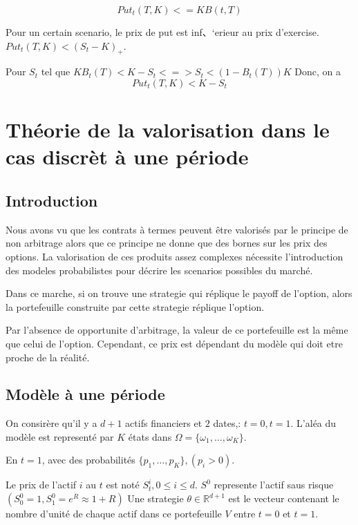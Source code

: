 \documentclass{article}
\begin{document}
\begin{equation}
Put_t(T, K) <= KB(t, T)
\end{equation}

Pour un certain scenario, le prix de put est inf、‘erieur au prix d'exercise. $Put_t(T, K)<(S_t-K)_+$.

Pour $S_t$ tel que $KB_t(T)< K-S_t <=> S_t < (1-B_t(T))K$
Donc, on a
\begin{equation}
Put_t(T, K)< K-S_t
\end{equation} 

\section{Th\'eorie de la valorisation dans le cas discr\`et \`a une p\'eriode}

\subsection{Introduction}
Nous avons vu que les contrats \`a termes peuvent \^{e}tre valoris\'es par le principe de non arbitrage alors que ce principe ne donne que des bornes sur les prix des options. La valorisation de ces produits assez complexes n\'ecessite l'introduction des modeles probabilistes pour d\'ecrire les scenarios possibles du march\'e.

Dans ce marche, si on trouve une strategie qui r\'eplique le payoff de l'option, alors la portefeuille construite par cette strategie r\'eplique l'option.

Par l'absence de opportunite d'arbitrage, la valeur de ce portefeuille est la m\^{e}me que celui de l'option. Cependant, ce prix est d\'ependant du mod\`ele qui doit etre proche de la r\'ealit\'e.

\subsection{Mod\`ele \`a une p\'eriode}

On consir\`ere qu'il y a $d+1$ actifs financiers et $2$ dates,: $t=0, t=1$. L'al\'ea du mod\`ele est represent\'e par $K$ \'etats dans $\Omega=\{\omega_1,\ldots,\omega_K\}$.

En $t=1$, avec des probabilit\'es $ \{p_1,\ldots,p_K\},(p_i>0) $.

Le prix de l'actif $i$ au $t$ est not\'e $S_t^i, 0\leq i\leq d$. $S^0$ represente l'actif saus risque $(S_0^0=1, S_1^0=e^R\approx 1+R)$
Une strategie $\theta\in\mathbb{R}^{d+1}$ est le vecteur contenant le nombre d'unit\'e de chaque actif dans ce portefeuille $V$ entre $t=0$ et $t=1$. 
\end{document}
